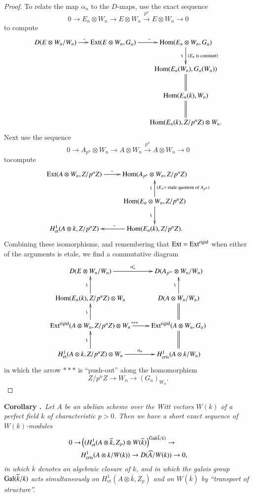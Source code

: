 \begin{proof}
To relate the map $\alpha_{n}$ to the $D$-maps, use the exact sequence
$$
0\to E_{n}\otimes W_{n}\to E\otimes W_{n}\xrightarrow{p^{n}} E\otimes W_{n}\to 0
$$
to compute
\[
\xymatrix@C=.5cm{
D(E\otimes W_{n}/W_{n})\ar[r]^{\sim} & \Ext(E\otimes W_{n},G_{a})\ar[r]^{\sim} & \Hom(E_{n}\otimes W_{n},G_{a})\ar[d]_{\rotatebox{90}{$\backsim$}}^-{(E_{n}\text{~ is constant})}\\
 & & \Hom(E_{n}(W_{n}),G_{a}(W_{n}))\ar@{=}[d]\\
 & & \Hom(E_{n}(k),W_{n})\ar@{=}[d]\\
 & & \Hom(E_{n}(k),Z/p^{n}Z)\otimes W_{n}.
}
\]
Next use the sequence
$$
0\to A_{p^{n}}\otimes W_{n}\to A\otimes W_{n}\xrightarrow{p^{n}} A\otimes W_{n}\to 0
$$
to\pageoriginale compute
\[
\xymatrix{
\Ext(A\otimes W_{n}, Z/p^{n}Z)\ar[r]^-{\sim} & \Hom(A_{p^{n}}\otimes W_{n},Z/p^{n}Z)  \\
 & \Hom(E_{n}\otimes W_{n},Z/p^{n}Z)\ar[u]^{\rotatebox{90}{$\backsim$}}_{(E_{n} = \text{~etale quotient of $A_{p^{n}}$})}\ar[d]_{\rotatebox{90}{$\backsim$}}\\
H^{1}_{\text{et}}(A\otimes k, Z/p^{n}Z) & \Hom(E_{n}(k),Z/p^{n}Z).\ar[l]_{\sim} 
}
\]
Combining these isomorphisms, and remembering that $\operatorname{Ext}=\operatorname{Ext}^{\text{rigid}}$ when either of the arguments is etale, we find a commutative diagram
\[
\xymatrix{
D(E\otimes W_{n}/W_{n})\ar[r]^-{\alpha'_{n}} & D(A_{p^{\infty}}\otimes W_{n}/W_{n})\\
\Hom(E_{n}(k),Z/p^{n}Z)\otimes W_{n}\ar[u]^{\rotatebox{90}{$\backsim$}} & D(A\otimes W_{n}/W_{n})\ar[u]^{\rotatebox{90}{$\backsim$}}\\
\Ext^{\text{rigid}}(A\otimes W_{n},Z/p^{n}Z)\otimes W_{n}\ar[r]^{*{*}*}\ar[u]^{\rotatebox{90}{$\backsim$}} & \Ext^{\text{rigid}}(A\otimes W_{n},G_{a})\ar@{=}[u]\\
H^{1}_{\text{et}}(A\otimes k, Z/p^{n}Z)\otimes W_{n}\ar[u]^{\rotatebox{90}{$\backsim$}}\ar[r]^-{\alpha_{n}} & H^{1}_{\text{cris}}(A\otimes k/W_{n})\ar@{=}[u]
}
\]
in which the arrow ${*}{*}{*}$ is ``push-out'' along the homomorphism
$$
Z/p^{n}Z\to W_{n}\to (G_{a})_{W_{n}}.
$$
\end{proof}

\medskip
\noindent
{\bf Corollary .\label{art6-coro5.7.7}}~{\em Let $A$ be an abelian scheme over the Witt vectors $W(k)$ of a perfect field $k$ of characteristic $p>0$. Then we have a short exact sequence of $W(k)$-modules}
\begin{align*}
0\to &\left((H^{1}_{\text{et}}(A\otimes \overline{k},Z_{p})\otimes W(\overline{k})\right)^{\operatorname{Gal}(\overline{k}/k)}\to\\
& H^{1}_{\text{cris}}(A\otimes k/W(k))\to D(\widehat{A}/W(k))\to 0,
\end{align*}
{\em in which $\overline{k}$ denotes an algebraic closure of $k$, and in which the galois group $\operatorname{Gal}(\overline{k}/k)$ acts simultaneously on $H^{1}_{\text{et}}(A\otimes \overline{k},Z_{p})$ and on $W(\overline{k})$ by ``transport of structure''.}

